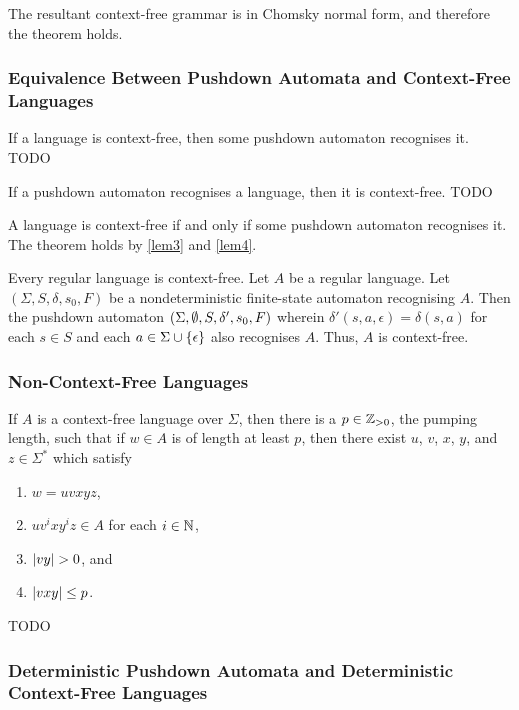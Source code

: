     The resultant context-free grammar is in Chomsky normal form, and therefore
    the theorem holds.
\Epr

\subsubsection{Equivalence Between Pushdown Automata and Context-Free Languages}

\Blm
    \label{lem3}
    If a language is context-free, then some pushdown automaton recognises it.
\Elm
\Bpr
    TODO
\Epr

\Blm
    \label{lem4}
    If a pushdown automaton recognises a language, then it is context-free.
\Elm
\Bpr
    TODO
\Epr

\Bth
    A language is context-free if and only if some pushdown automaton recognises
    it.
\Eth
\Bpr
    The theorem holds by \autoref{lem3} and \autoref{lem4}.
\Epr

\Bcr
    Every regular language is context-free.
\Ecr
\Bpr
    Let \(A\) be a regular language. Let \((\Sigma, S, \delta, s_0, F)\) be a
    nondeterministic finite-state automaton recognising \(A\). Then the pushdown
    automaton \((\Sigma, \emptyset, S, \delta', s_0, F)\) wherein \(\delta'(s, a,
    \epsilon) = \delta(s, a)\) for each \(s \in S\) and each \(a \in \Sigma \cup
    \{\epsilon\}\) also recognises \(A\). Thus, \(A\) is context-free.
\Epr

\subsubsection{Non-Context-Free Languages}

    If \(A\) is a context-free language over \(\Sigma\), then there is a \(p \in
    \mathbb{Z}_{>0}\), the pumping length, such that if \(w \in A\) is of length at
    least \(p\), then there exist \(u\), \(v\), \(x\), \(y\), and \(z \in
    \Sigma^*\) which satisfy
    \begin{enumerate}
        \item \(w = u v x y z\),
        \item \(u v^i x y^i z \in A\) for each \(i \in \mathbb{N}\),
        \item \(\lvert v y\rvert > 0\), and
        \item \(\lvert v x y\rvert \leq p\).
    \end{enumerate}
\Eth
\Bpr
    TODO
\Epr

\subsubsection{Deterministic Pushdown Automata and Deterministic Context-Free
Languages}

\Edc
